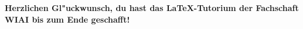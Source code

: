 




\setcounter{page}{2}
\tableofcontents
\newpage
\listoffigures
\newpage
\listoftables
\newpage
\setcounter{page}{1}

\newpage

\newpage


\textbf{Herzlichen Gl"uckwunsch, du hast das \LaTeX -Tutorium der Fachschaft WIAI bis zum Ende geschafft!}

